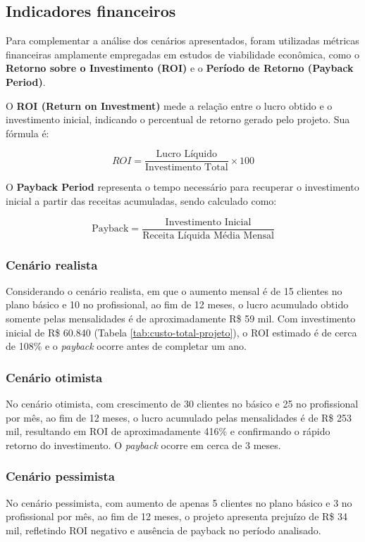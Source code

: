 \subsection{Indicadores financeiros}

Para complementar a análise dos cenários apresentados, foram utilizadas métricas financeiras amplamente empregadas em estudos de viabilidade econômica, como o \textbf{Retorno sobre o Investimento (ROI)} e o \textbf{Período de Retorno (Payback Period)}.

O \textbf{ROI (Return on Investment)} mede a relação entre o lucro obtido e o investimento inicial, indicando o percentual de retorno gerado pelo projeto. Sua fórmula é:

\[
ROI = \frac{\text{Lucro Líquido}}{\text{Investimento Total}} \times 100
\]

O \textbf{Payback Period} representa o tempo necessário para recuperar o investimento inicial a partir das receitas acumuladas, sendo calculado como:

\[
\text{Payback} = \frac{\text{Investimento Inicial}}{\text{Receita Líquida Média Mensal}}
\]

\subsubsection{Cenário realista}

Considerando o cenário realista, em que o aumento mensal é de 15 clientes no plano básico e 10 no profissional, ao fim de 12 meses, o lucro acumulado obtido somente pelas mensalidades é de aproximadamente R\$ 59 mil.  
Com investimento inicial de R\$ 60.840 (Tabela \ref{tab:custo-total-projeto}), o ROI estimado é de cerca de 108\% e o \textit{payback} ocorre antes de completar um ano.

\subsubsection{Cenário otimista}

No cenário otimista, com crescimento de 30 clientes no básico e 25 no profissional por mês, ao fim de 12 meses, o lucro acumulado pelas mensalidades é de R\$ 253 mil, resultando em ROI de aproximadamente 416\% e confirmando o rápido retorno do investimento. O \textit{payback} ocorre em cerca de 3 meses.

\subsubsection{Cenário pessimista}

No cenário pessimista, com aumento de apenas 5 clientes no plano básico e 3 no profissional por mês, ao fim de 12 meses, o projeto apresenta prejuízo de R\$ 34 mil, refletindo ROI negativo e ausência de payback no período analisado.
